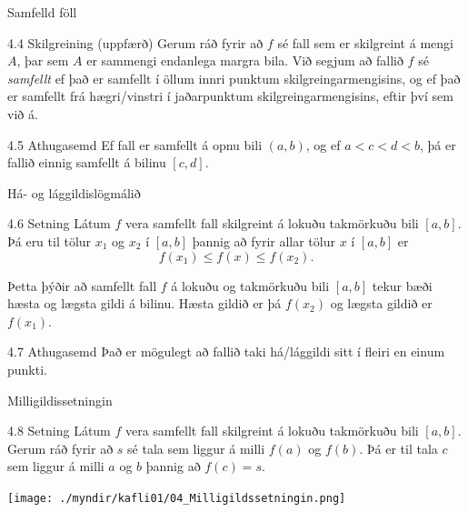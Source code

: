 \documentclass[icelandic,a4paper,12pt]{article}
\begin{document}
\begin{frame}{Samfelld föll}
 \begin{block}{4.4 Skilgreining (uppfærð)}
 Gerum ráð fyrir að $f$ sé fall sem er skilgreint á
 mengi $A$, þar sem $A$ er sammengi endanlega margra bila.
 Við segjum að fallið $f$ sé \emph{samfellt} ef það er samfellt í 
 öllum innri punktum skilgreingarmengisins, og ef það er samfellt
 frá hægri/vinstri í jaðarpunktum skilgreingarmengisins,
 eftir því sem við á.
\end{block}
\pause
\begin{block}{4.5 Athugasemd}
	Ef fall er samfellt á opnu bili $(a,b)$, og ef 
	$a<c<d<b$, þá er fallið einnig samfellt á bilinu 
	$[c,d]$.
 \end{block}
\end{frame}

\begin{frame}{Há- og lággildislögmálið}
 \begin{block}{4.6 Setning}
 Látum $f$ vera samfellt fall skilgreint á lokuðu takmörkuðu bili
  $[a,b]$.  Þá eru til tölur $x_1$ og $x_2$ í $[a,b]$ þannig að 
fyrir allar tölur $x$ í $[a,b]$ er
$$f(x_1)\leq f(x)\leq f(x_2).$$

\pause

Þetta þýðir að samfellt fall $f$ á lokuðu og takmörkuðu
bili $[a,b]$ tekur bæði hæsta og lægsta gildi á bilinu. \pause
Hæsta
gildið er þá $f(x_2)$ og lægsta gildið er $f(x_1)$.
\end{block}

\pause
 
\begin{block}{4.7 Athugasemd}
 Það er mögulegt að fallið taki há/lággildi
 sitt í fleiri en einum punkti.
\end{block}
\end{frame}

\begin{frame}{Milligildissetningin}
 \begin{block}{4.8 Setning}
 Látum $f$ vera samfellt fall skilgreint á lokuðu takmörkuðu bili
$[a,b]$.  Gerum ráð fyrir að $s$ sé tala sem liggur á milli $f(a)$ og
$f(b)$.  Þá er til tala $c$ sem liggur á milli $a$ og $b$ þannig að
$f(c)=s$. 
 \end{block}
\begin{center}
 \texttt{[image: ./myndir/kafli01/04\_Milligildssetningin.png]}
\end{center}
\end{frame}
\end{document}
